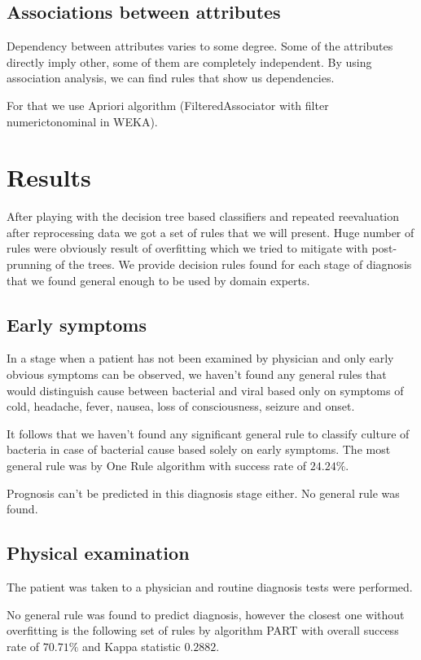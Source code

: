 \documentclass[11pt]{article}
\begin{document}
\subsection{Associations between attributes}
Dependency between attributes varies to some degree. Some of the attributes
directly imply other, some of them are completely independent. By using
association analysis, we can find rules that show us dependencies.

For that we use Apriori algorithm (FilteredAssociator with filter
numerictonominal in WEKA).



\section{Results}
After playing with the decision tree based classifiers and repeated
reevaluation after reprocessing data we got a set of rules that we will
present. Huge number of rules were obviously result of overfitting which we
tried to mitigate with post-prunning of the trees. We provide decision rules
found for each stage of diagnosis that we found general enough to be used by
domain experts.

\subsection{Early symptoms}
In a stage when a patient has not been examined by physician and only early
obvious symptoms can be observed, we haven't found any general rules that would
distinguish cause between bacterial and viral based only on symptoms of cold,
headache, fever, nausea, loss of consciousness, seizure and onset.

It follows that we haven't found any significant general rule to classify
culture of bacteria in case of bacterial cause based solely on early symptoms.
The most general rule was by One Rule algorithm with success rate of $24.24\%$.

Prognosis can't be predicted in this diagnosis stage either. No general rule
was found.

\subsection{Physical examination}
The patient was taken to a physician and routine diagnosis tests were
performed.

No general rule was found to predict diagnosis, however the closest one without
overfitting is the following set of rules by algorithm PART with overall
success rate of $70.71\%$ and Kappa statistic $0.2882$.
\end{document}
